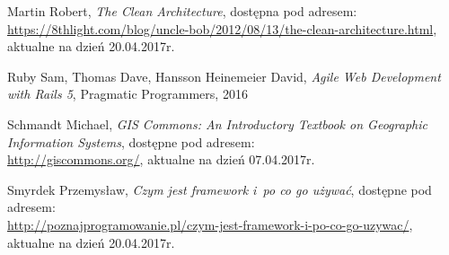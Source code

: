 \documentclass[printmode]{mgr}
\begin{document}
\begin{thebibliography}{inz}
  Martin Robert, \emph{The Clean Architecture}, dostępna pod adresem:\\ \url{https://8thlight.com/blog/uncle-bob/2012/08/13/the-clean-architecture.html}, aktualne na dzień 20.04.2017r.

  Ruby Sam, Thomas Dave, Hansson Heinemeier David, \emph{Agile Web Development with Rails 5}, Pragmatic Programmers, 2016

  Schmandt Michael, \emph{GIS Commons: An Introductory Textbook on Geographic Information Systems}, dostępne pod adresem:\\
  \url{http://giscommons.org/}, aktualne na dzień 07.04.2017r.

  Smyrdek Przemysław, \emph{Czym jest framework i~po co go używać}, dostępne pod adresem:\\
  \url{http://poznajprogramowanie.pl/czym-jest-framework-i-po-co-go-uzywac/}, aktualne na dzień 20.04.2017r.
  
  
 
\end{thebibliography}
\end{document}

